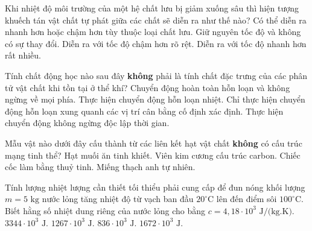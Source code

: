 \begin{ex}%
	Khi nhiệt độ môi trường của một hệ chất lưu bị giảm xuống sâu thì hiện tượng khuếch tán vật chất tự phát giữa các chất sẽ diễn ra như thế nào?
	\choice
	{Có thể diễn ra nhanh hơn hoặc chậm hơn tùy thuộc loại chất lưu.}
	{Giữ nguyên tốc độ và không có sự thay đổi.}
	{\True Diễn ra với tốc độ chậm hơn rõ rệt.}
	{Diễn ra với tốc độ nhanh hơn rất nhiều.}
\end{ex}

\begin{ex}%
	Tính chất động học nào sau đây \textbf{không} phải là tính chất đặc trưng của các phân tử vật chất khi tồn tại ở thể khí?
	\choice
	{Chuyển động hoàn toàn hỗn loạn và không ngừng về mọi phía.}
	{Thực hiện chuyển động hỗn loạn nhiệt.}
	{\True Chỉ thực hiện chuyển động hỗn loạn xung quanh các vị trí cân bằng cố định xác định.}
	{Thực hiện chuyển động không ngừng độc lập thời gian.}
\end{ex}

\begin{ex}%
	Mẫu vật nào dưới đây cấu thành từ các liên kết hạt vật chất \textbf{không} có cấu trúc mạng tinh thể?
	\choice
	{Hạt muối ăn tinh khiết.}
	{Viên kim cương cấu trúc carbon.}
	{\True Chiếc cốc làm bằng thuỷ tinh.}
	{Miếng thạch anh tự nhiên.}
\end{ex}

\begin{ex}%
	Tính lượng nhiệt lượng cần thiết tối thiểu phải cung cấp để đun nóng khối lượng $m = 5\text{ kg}$ nước lỏng tăng nhiệt độ từ vạch ban đầu $20^\circ\text{C}$ lên đến điểm sôi $100^\circ\text{C}$. Biết hằng số nhiệt dung riêng của nước lỏng cho bằng $c = 4,18 \cdot 10^{3}\text{ J/(kg.K)}$.
	\choice
	{$3344 \cdot 10^{3}\text{ J}$.}
	{$1267 \cdot 10^{3}\text{ J}$.}
	{$836 \cdot 10^{3}\text{ J}$.}
	{\True $1672 \cdot 10^{3}\text{ J}$.}
\end{ex}

